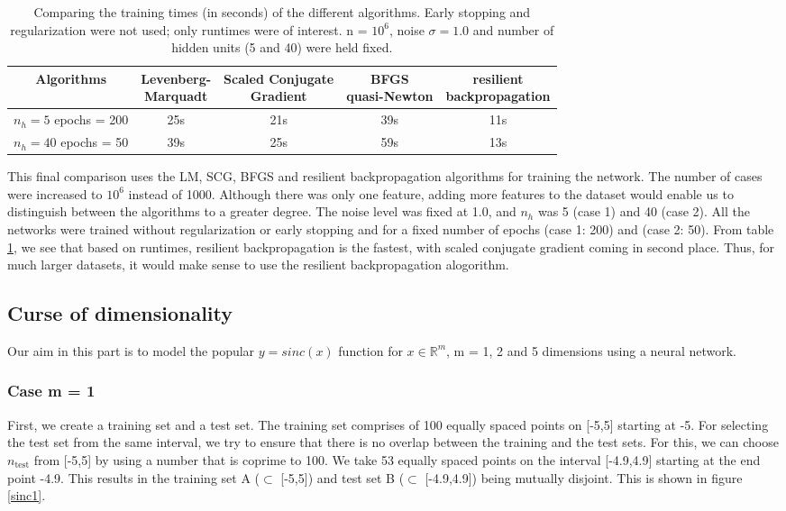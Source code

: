 \documentclass[paper=a4, fontsize=11pt]{scrartcl} %
\numberwithin{equation}{section} %
\begin{document}
\begin{table}[ht]
\centering
\begin{tabular}{c|c|c|c|c}
\hline
Algorithms & \thead{Levenberg-\\Marquadt} & \thead{Scaled Conjugate \\Gradient} & \thead{BFGS \\ quasi-Newton} & \thead{resilient \\ backpropagation} \\
\hline
\thead{$n_h=5$ \\ epochs = 200} & 25s & 21s & 39s & 11s \\
\hline
\thead{$n_h=40$ \\ epochs = 50} & 39s & 25s & 59s & 13s \\
\hline
\end{tabular}
\caption{Comparing the training times (in seconds) of the different algorithms. Early stopping and regularization were not used; only runtimes were of interest. n = $10^6$, noise $\sigma=1.0$ and number of hidden units (5 and 40) were held fixed.}
\label{algorithm}
\end{table}

This final comparison uses the LM, SCG, BFGS and resilient backpropagation algorithms for training the network. The number of cases were increased to $10^6$ instead of 1000. Although there was only one feature, adding more features to the dataset would enable us to distinguish between the algorithms to a greater degree. The noise level was fixed at 1.0, and $n_h$ was 5 (case 1) and 40 (case 2). All the networks were trained without regularization or early stopping and for a fixed number of epochs (case 1: 200) and (case 2: 50). From table \ref{algorithm}, we see that based on runtimes, resilient backpropagation is the fastest, with scaled conjugate gradient coming in second place. Thus, for much larger datasets, it would make sense to use the resilient backpropagation alogorithm.

\subsection{Curse of dimensionality}
Our aim in this part is to model the popular $y=sinc(x)$ function for $x \in \mathbb{R}^m$, m = 1, 2 and 5 dimensions using a neural network.

\subsubsection*{Case m = 1}
First, we create a training set and a test set. The training set comprises of 100 equally spaced points on [-5,5] starting at -5. For selecting the test set from the same interval, we try to ensure that there is no overlap between the training and the test sets. For this, we can choose $n_{\mathrm{test}}$ from [-5,5] by using a number that is coprime to 100. We take 53 equally spaced points on the interval [-4.9,4.9] starting at the end point -4.9. This results in the training set A ($\subset$ [-5,5]) and test set B ($\subset$ [-4.9,4.9]) being mutually disjoint. This is shown in figure \ref{sinc1}.
\end{document}
